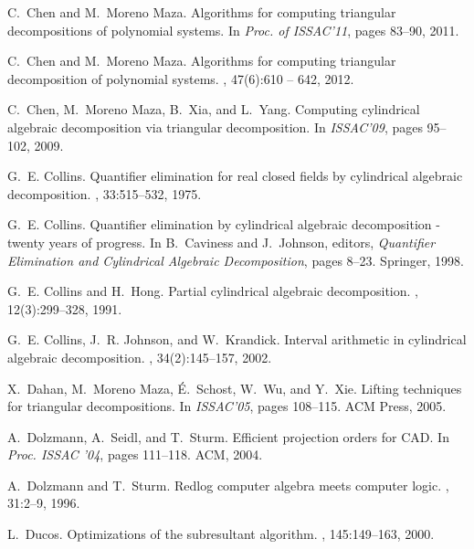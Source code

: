 \documentclass[10pt]{article}
\begin{document}
\begin{center}
\begin{thebibliography}{10}
C.~Chen and M.~{Moreno Maza}.
\newblock Algorithms for computing triangular decompositions of polynomial
  systems.
\newblock In {\em Proc. of ISSAC'11}, pages 83--90, 2011.

C.~Chen and M.~{Moreno Maza}.
\newblock Algorithms for computing triangular decomposition of polynomial
  systems.
, 47(6):610 -- 642, 2012.

C.~Chen, M.~{Moreno Maza}, B.~{Xia}, and L.~Yang.
\newblock Computing cylindrical algebraic decomposition via triangular
  decomposition.
\newblock In {\em ISSAC'09}, pages 95--102, 2009.

G.~E. Collins.
\newblock Quantifier elimination for real closed fields by cylindrical
  algebraic decomposition.
, 33:515--532, 1975.

G.~E. Collins.
\newblock Quantifier elimination by cylindrical algebraic decomposition -
  twenty years of progress.
\newblock In B.~Caviness and J.~Johnson, editors, {\em Quantifier Elimination
  and Cylindrical Algebraic Decomposition}, pages 8--23. Springer, 1998.

G.~E. Collins and H.~Hong.
\newblock Partial cylindrical algebraic decomposition.
, 12(3):299--328, 1991.

G.~E. Collins, J.~R. Johnson, and W.~Krandick.
\newblock Interval arithmetic in cylindrical algebraic decomposition.
, 34(2):145--157, 2002.

X.~{Dahan}, M.~{{Moreno Maza}}, {\'E}.~{Schost}, W.~{Wu}, and Y.~{Xie}.
\newblock Lifting techniques for triangular decompositions.
\newblock In {\em ISSAC'05}, pages 108--115. ACM Press, 2005.

A.~Dolzmann, A.~Seidl, and T.~Sturm.
\newblock Efficient projection orders for {CAD}.
\newblock In {\em Proc. ISSAC '04}, pages 111--118. ACM, 2004.

A.~Dolzmann and T.~Sturm.
\newblock Redlog computer algebra meets computer logic.
, 31:2--9, 1996.

L.~Ducos.
\newblock Optimizations of the subresultant algorithm.
, 145:149--163, 2000.


\end{thebibliography}
\end{center}
\end{document}
